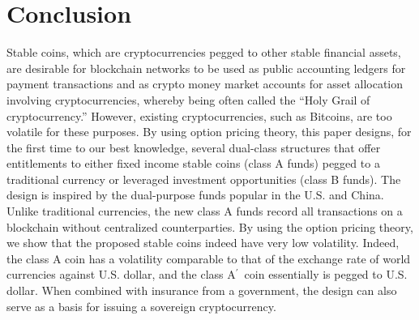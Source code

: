 \documentclass[11pt]{article}%
\numberwithin{equation}{section}
\theoremstyle{plain}
\newcommand{\Ap}{A\ensuremath{^\prime}~}
\begin{document}
\section{Conclusion}
Stable coins, which are cryptocurrencies pegged to other stable financial assets, are desirable for blockchain networks to be used as public accounting ledgers for payment transactions  and as crypto money market accounts for asset allocation involving cryptocurrencies, whereby being often called the ``Holy Grail of cryptocurrency.'' However, existing cryptocurrencies, such as Bitcoins, are too volatile for these purposes. By using option pricing theory, this paper designs, for the first time to our best knowledge, several dual-class structures that offer entitlements to either fixed income stable coins (class A funds) pegged to a traditional currency or leveraged investment opportunities (class B funds). The design is inspired by the dual-purpose funds popular in the U.S. and China. Unlike traditional currencies, the new class A funds record all transactions on a blockchain without centralized counterparties. By using the option pricing theory, we show that the proposed stable coins indeed have very low volatility. Indeed, the class A coin has a volatility comparable to that of the exchange rate of world currencies against U.S. dollar, and the class \Ap coin essentially is pegged to U.S. dollar. When combined with insurance from a government, the design can also serve as a basis for issuing a sovereign cryptocurrency.


%




\newpage





%

\setcounter{page}{1}
\renewcommand{\thepage}{A--\arabic{page}}
\end{document}
